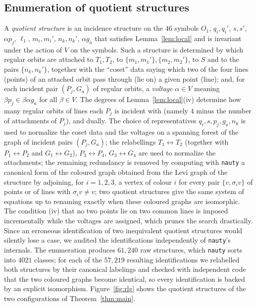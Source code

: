 \documentclass[11pt]{article}
\theoremstyle{plain}
\theoremstyle{definition}
\begin{document}
\subsection{Enumeration of quotient structures}
A \emph{quotient structure} is an incidence structure on the $46$ symbols $O_1$, $q_i,q_i'$, $s,s'$, $\alpha p_j$, $\ell_1$, $m_i,m_i'$, $n_k,n_k'$, $\alpha g_a$ that satisfies Lemma~\ref{lem:local} and is invariant under the action of $V$ on the symbols.  Such a structure is determined by which regular orbits are attached to $T_1,T_2$, to $\{m_1,m_1'\},\{m_2,m_2'\}$, to $S$ and to the pairs $\{n_k,n_k'\}$, together with the ``coset'' data saying which two of the four lines (points) of an attached orbit pass through (lie on) a given point (line); and, for each incident pair $(P_j,G_a)$ of regular orbits, a \emph{voltage} $\alpha\in V$ meaning $\beta p_j\in\beta\alpha g_a$ for all $\beta\in V$.  The degrees of Lemma~\ref{lem:local}(iv) determine how many regular orbits of lines each $P_j$ is incident with (namely $4$ minus the number of attachments of $P_j$), and dually.  The choice of representatives $q_i,s,p_j,g_a,n_k$ is used to normalize the coset data and the voltages on a spanning forest of the graph of incident pairs $(P_j,G_a)$; the relabellings $T_1\leftrightarrow T_2$ (together with $P_1\leftrightarrow P_2$ and $G_1\leftrightarrow G_2$), $P_3\leftrightarrow P_4$, $G_3\leftrightarrow G_4$ are used to normalize the attachments; the remaining redundancy is removed by computing with \texttt{nauty} \cite{MP14} a canonical form of the coloured graph obtained from the Levi graph of the structure by adjoining, for $i=1,2,3$, a vertex of colour $i$ for every pair $\{v,\sigma_iv\}$ of points or of lines with $\sigma_iv\ne v$; two quotient structures give the same system of equations up to renaming exactly when these coloured graphs are isomorphic.  The condition (iv) that no two points lie on two common lines is imposed incrementally while the voltages are assigned, which prunes the search drastically.  Since an erroneous identification of two inequivalent quotient structures would silently lose a case, we audited the identifications independently of \texttt{nauty}'s internals.  The enumeration produces $61{,}240$ raw structures, which \texttt{nauty} sorts into $4021$ classes; for each of the $57{,}219$ resulting identifications we relabelled both structures by their canonical labelings and checked with independent code that the two coloured graphs become identical, so every identification is backed by an explicit isomorphism.  Figure~\ref{fig:rlg} shows the quotient structures of the two configurations of Theorem~\ref{thm:main}.
\end{document}
